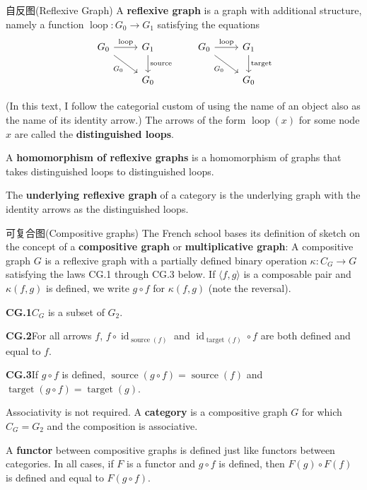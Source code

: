 \documentclass{beamer}
\begin{document}
\begin{frame}[fragile]{自反图(Reflexive Graph)}
A \textbf{reflexive graph} is a graph with additional structure, namely a function $\operatorname{loop}\colon G_0 \to G_1$ satisfying the equations
\[
\begin{tikzcd}
G_0 \arrow[r, "\operatorname{loop}"] \arrow[dr, "G_0"'] & G_1 \arrow[d, "\operatorname{source}"] \\
& G_0
\end{tikzcd}
\qquad
\begin{tikzcd}
G_0 \arrow[r, "\operatorname{loop}"] \arrow[dr, "G_0"'] & G_1 \arrow[d, "\operatorname{target}"] \\
& G_0
\end{tikzcd}
\]

\vspace{2mm}

(In this text, I follow the categorial custom of using the name of an object also as the name of its identity arrow.) The arrows of the form $\operatorname{loop}(x)$ for some node $x$ are called the \textbf{distinguished loops}.

\vspace{2mm}

A \textbf{homomorphism of reflexive graphs} is a homomorphism of graphs that takes distinguished loops to distinguished loops.

\vspace{2mm}

The \textbf{underlying reflexive graph} of a category is the underlying graph with the identity arrows as the distinguished loops.
\end{frame}

\begin{frame}{可复合图(Compositive graphs)}
The French school bases its definition of sketch on the concept of a \textbf{compositive graph} or \textbf{multiplicative graph}: A compositive graph $G$ is a reflexive graph with a partially defined binary operation $\kappa\colon C_G \to G$ satisfying the laws CG.1 through CG.3 below. If $\langle f,g\rangle$ is a composable pair and $\kappa(f,g)$ is defined, we write $g\circ f$ for $\kappa(f,g)$ (note the reversal).

\noindent\textbf{CG.1}\quad $C_G$ is a subset of $G_2$.

\noindent\textbf{CG.2}\quad For all arrows $f$, $f\circ \operatorname{id}_{\operatorname{source}(f)}$ and $\operatorname{id}_{\operatorname{target}(f)}\circ f$ are both defined and equal to $f$.

\noindent\textbf{CG.3}\quad If $g\circ f$ is defined, $\operatorname{source}(g\circ f) = \operatorname{source}(f)$ and $\operatorname{target}(g\circ f) = \operatorname{target}(g)$.

\medskip

Associativity is not required. A \textbf{category} is a compositive graph $G$ for which $C_G = G_2$ and the composition is associative.

A \textbf{functor} between compositive graphs is defined just like functors between categories. In all cases, if $F$ is a functor and $g\circ f$ is defined, then $F(g)\circ F(f)$ is defined and equal to $F(g\circ f)$.
\end{frame}
\end{document}
